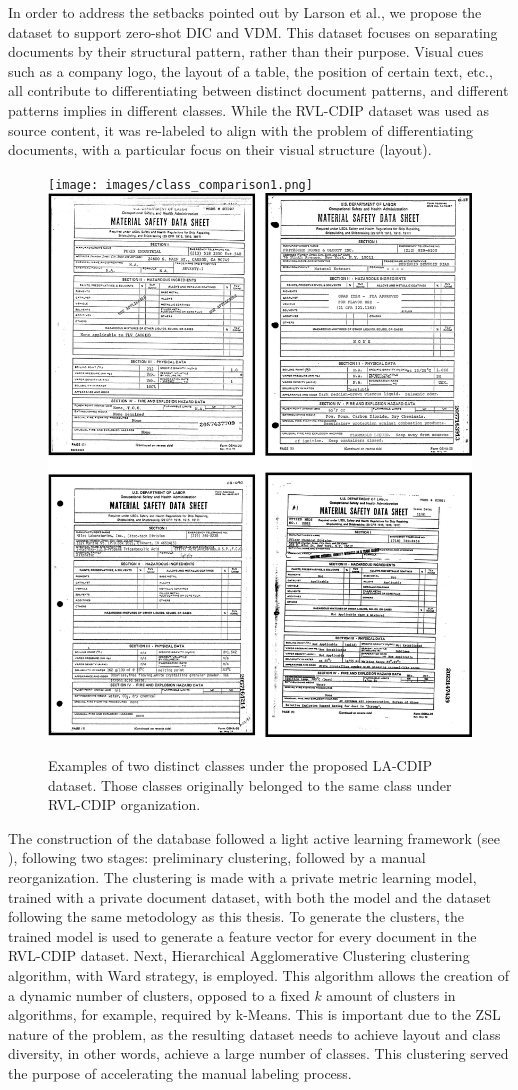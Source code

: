 In order to address the setbacks pointed out by Larson et al., we propose the  dataset to support zero-shot \gls{DIC} and \gls{VDM}. This dataset focuses on separating documents by their structural pattern, rather than their purpose. Visual cues such as a company logo, the layout of a table, the position of certain text, etc., all contribute to differentiating between distinct document patterns, and different patterns implies in different classes. While the \gls{RVL-CDIP} dataset was used as source content, it was re-labeled to align with the problem of differentiating documents, with a particular focus on their visual structure (layout). 

\begin{figure}[htbp]
  \centering
\texttt{[image: images/class\_comparison1.png]} \hspace{.04\textwidth}
    \includegraphics[width=.455\textwidth]{images/class_comparison2.png}

\caption{Examples of two distinct classes under the proposed \gls{LA-CDIP} dataset. Those classes originally belonged to the same class under RVL-CDIP organization.\label{img:dataset}}
\end{figure}   

The construction of the database followed a light active learning framework (see ), following two stages: preliminary clustering, followed by a manual reorganization. The clustering is made with a private metric learning model, trained with a private document dataset, with both the model and the dataset following the same metodology as this thesis. To generate the clusters, the trained model is used to generate a feature vector for every document in the \gls{RVL-CDIP} dataset. Next, Hierarchical Agglomerative Clustering clustering algorithm, with Ward\cite{ward_jr_hierarchical_1963} strategy, is employed. This algorithm allows the creation of a dynamic number of clusters, opposed to a fixed $k$ amount of clusters in algorithms, for example, required by k-Means. This is important due to the \gls{ZSL} nature of the problem, as the resulting dataset needs to achieve layout and class diversity, in other words, achieve a large number of classes. This clustering served the purpose of accelerating the manual labeling process.

